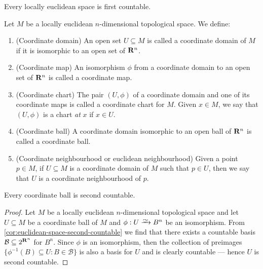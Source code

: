\begin{proposition}
\label{prop:locally-euclidean-first-countable}
Every locally euclidean space is first countable.
\end{proposition}


\begin{definition}[Miscellaneous]
Let \(M\) be a locally euclidean \(n\)-dimensional topological space. We
define:
\begin{enumerate}[(C1)]
  \item\label{def: coordinate domain}
    (Coordinate domain) An open set \(U \subseteq M\) is called a coordinate
    domain of \(M\) if it is isomorphic to an open set of \(\mathbf{R}^n\).
  \item\label{def: coordinate map}
    (Coordinate map) An isomorphism \(\phi\) from a coordinate domain to an
    open set of \(\mathbf{R}^n\) is called a coordinate map.
  \item\label{def: coordinate chart}
    (Coordinate chart) The pair \((U, \phi)\) of a coordinate domain and one
    of its coordinate maps is called a coordinate chart for \(M\). Given \(x \in
    M\), we say that \((U, \phi)\) is a chart \emph{at} \(x\) if \(x \in U\).
  \item\label{def: coordinate ball}
    (Coordinate ball) A coordinate domain isomorphic to an open ball of
    \(\mathbf{R}^n\) is called a coordinate ball.
  \item\label{def: euclidean neighbourhood}
    (Coordinate neighbourhood or euclidean neighbourhood) Given a point \(p
    \in M\), if \(U \subseteq M\) is a coordinate domain of \(M\) such that
    \(p \in U\), then we say that \(U\) is a coordinate neighbourhood of
    \(p\).
\end{enumerate}
\end{definition}

\begin{proposition}
\label{prop:coordinate-ball-second-countable}
Every coordinate ball is second countable.
\end{proposition}

\begin{proof}
Let \(M\) be a locally euclidean \(n\)-dimensional topological space and let
\(U \subseteq M\) be a coordinate ball of \(M\) and \(\phi: U \isoto B^n\) be an
isomorphism. From \cref{cor:euclidean-space-second-countable} we find that there
exists a countable basis \(\mathcal B \subseteq 2^{\mathbf{R}^n}\) for \(B^n\). Since
\(\phi\) is an isomorphism, then the collection of preimages \(\{\phi^{-1}(B)
\subseteq U \colon B \in \mathcal B\}\) is also a basis for \(U\) and is clearly
countable --- hence \(U\) is second countable.
\end{proof}


